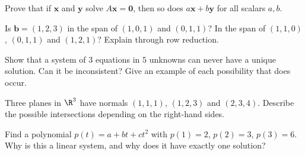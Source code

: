 \begin{exercise}
Prove that if $\mathbf{x}$ and $\mathbf{y}$ solve $A\mathbf{x}=\mathbf{0}$, then so does $a\mathbf{x}+b\mathbf{y}$ for all scalars $a,b$.
\end{exercise}

\begin{exercise}
Is $\mathbf{b}=(1,2,3)$ in the span of $(1,0,1)$ and $(0,1,1)$? In the span of $(1,1,0)$, $(0,1,1)$ and $(1,2,1)$? Explain through row reduction.
\end{exercise}

\begin{exercise}
Show that a system of $3$ equations in $5$ unknowns can never have a unique solution. Can it be inconsistent? Give an example of each possibility that does occur.
\end{exercise}

\begin{exercise}
Three planes in $\R^3$ have normals $(1,1,1)$, $(1,2,3)$ and $(2,3,4)$. Describe the possible intersections depending on the right-hand sides.
\end{exercise}

\begin{exercise}
Find a polynomial $p(t)=a+bt+ct^2$ with $p(1)=2$, $p(2)=3$, $p(3)=6$. Why is this a linear system, and why does it have exactly one solution?
\end{exercise}
